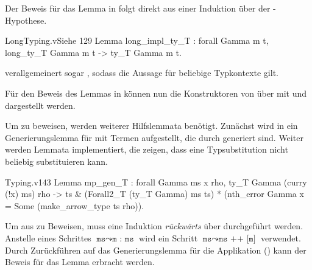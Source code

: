 Der Beweis für das Lemma in  folgt direkt aus einer Induktion über der -Hypothese.

\begin{code}{LongTyping.v}{Siehe }{129}
Lemma long_impl_ty_T : forall Gamma m t, 
    long_ty_T Gamma m t -> ty_T Gamma m t.
\end{code}
\begin{remark}
     verallgemeinert sogar , sodass die Aussage für beliebige Typkontexte gilt.
\end{remark}

Für den Beweis des Lemmas in  können nun die Konstruktoren von  über  mit  und  dargestellt werden.

Um  zu beweisen, werden weiterer Hilfslemmata benötigt. Zunächst wird in  ein Generierungslemma für  mit Termen aufgestellt, die durch  generiert sind. Weiter werden Lemmata implementiert, die zeigen, dass eine Typsubstitution nicht beliebig substituieren kann.
\begin{code}[mp_gen_T]{Typing.v}{}{143}
Lemma mp_gen_T : forall Gamma ms x rho, 
    ty_T Gamma (curry (!x) ms) rho ->
      { ts & (Forall2_T (ty_T Gamma) ms ts) * 
             (nth_error Gamma x = Some (make_arrow_type ts rho))}.
\end{code}
Um  aus  zu Beweisen, muss eine Induktion \emph{rückwärts} über  durchgeführt werden. Anstelle eines Schrittes $\texttt{ms} \leadsto \texttt{m : ms}$ wird ein Schritt $\texttt{ms} \leadsto \texttt{ms ++ [m]}$ verwendet. Durch Zurückführen auf das Generierungslemma für die Applikation () kann der Beweis für das Lemma erbracht werden.

